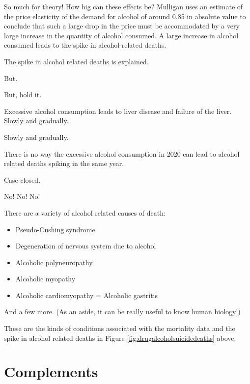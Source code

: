 \documentclass[
]{book}
\providecommand{\tightlist}{%
  \setlength{\itemsep}{0pt}\setlength{\parskip}{0pt}}
\begin{document}
So much for theory! How big can these effects be? Mulligan uses an estimate of the price elasticity of the demand for alcohol of around 0.85 in absolute value to conclude that such a large drop in the price must be accommodated by a very large increase in the quantity of alcohol consumed. A large increase in alcohol consumed leads to the spike in alcohol-related deaths.

The spike in alcohol related deaths is explained.

\begin{center}
But.

But, hold it.

\end{center}

Excessive alcohol consumption leads to liver disease and failure of the liver. Slowly and gradually.

\begin{center}
Slowly and gradually.

\end{center}

There is no way the excessive alcohol consumption in 2020 can lead to alcohol related deaths spiking in the same year.

\begin{center}
Case closed.

No! No! No!

\end{center}

There are a variety of alcohol related causes of death:

\begin{itemize}
\tightlist
\item
  Pseudo-Cushing syndrome
\item
  Degeneration of nervous system due to alcohol
\item
  Alcoholic polyneuropathy
\item
  Alcoholic myopathy
\item
  Alcoholic cardiomyopathy
  = Alcoholic gastritis
\end{itemize}

And a few more. (As an aside, it can be really useful to know human biology!)

These are the kinds of conditions associated with the mortality data and the spike in alcohol related deaths in Figure \ref{fig:drugalcoholsuicidedeaths} above.

\hypertarget{complements}{%
\section{Complements}\label{complements}}
\end{document}
